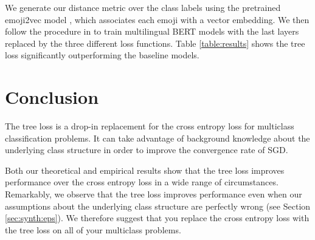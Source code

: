\documentclass[twoside]{article}
\begin{document}
We generate our distance metric over the class labels using the pretrained emoji2vec model \citep{Eisner2016emoji2vecLE},
which associates each emoji with a vector embedding.
We then follow the procedure in \citet{stoikos2020multilingual} to train multilingual BERT models \citep{Feng2020LanguageagnosticBS} with the last layers replaced by the three different loss functions.
Table \ref{table:results} shows the tree loss significantly outperforming the baseline models.

\section{Conclusion}
The tree loss is a drop-in replacement for the cross entropy loss for multiclass classification problems.
It can take advantage of background knowledge about the underlying class structure in order to improve the convergence rate of SGD.

Both our theoretical and empirical results show that the tree loss improves performance over the cross entropy loss in a wide range of circumstances.
Remarkably, we observe that the tree loss improves performance even when our assumptions about the underlying class structure are perfectly wrong (see Section \ref{sec:synth:eps}).
We therefore suggest that you replace the cross entropy loss with the tree loss on all of your multiclass problems.




\end{document}
